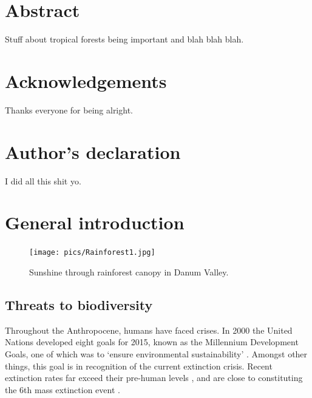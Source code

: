 \documentclass[12pt,a4paper,]{report}
\theoremstyle{definition}
\theoremstyle{definition}
\theoremstyle{definition}
\theoremstyle{remark}
\begin{document}
\chapter*{Abstract}\label{abstract}

Stuff about tropical forests being important and blah blah blah.

\pagebreak

\chapter*{Acknowledgements}\label{acknowledgements}

Thanks everyone for being alright.

\pagebreak

\chapter*{Author's declaration}\label{authors-declaration}

I did all this shit yo.

\pagebreak

\pagestyle{fancyplain} \fancyhf{}
\fancyhead[R]{\nouppercase\chaptername \space \thechapter}
\fancyfoot[R]{\thepage} 

\chapter{General introduction}\label{general-introduction}

\begin{figure}[!htb]
\centering
\texttt{[image: pics/Rainforest1.jpg]}
\caption*{Sunshine through rainforest canopy in Danum Valley.}
\end{figure}

\pagebreak

\section{Threats to biodiversity}\label{threats-to-biodiversity}

Throughout the Anthropocene, humans have faced crises. In 2000 the
United Nations developed eight goals for 2015, known as the Millennium
Development Goals, one of which was to `ensure environmental
sustainability' \citep{united_nations_united2014}. Amongst other things,
this goal is in recognition of the current extinction crisis. Recent
extinction rates far exceed their pre-human levels
\citep{pimm_future1995}, and are close to constituting the 6th mass
extinction event \citep{barnosky_has2011}.
\end{document}
